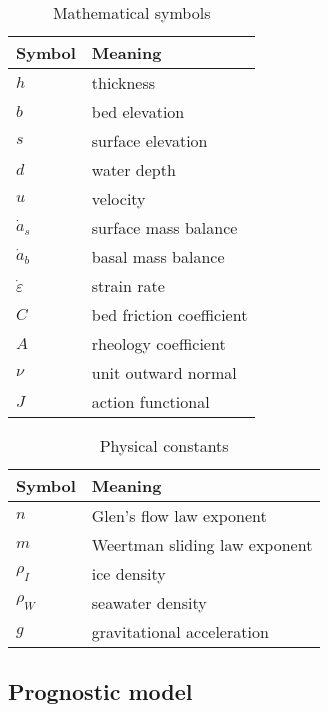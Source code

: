 \documentclass{article}
\theoremstyle{definition}
\theoremstyle{plain}
\begin{document}
\begin{table}[h]
    \begin{tabular}{l|l}
        Symbol & Meaning \\
        \hline
        $h$ & thickness \\
        $b$ & bed elevation  \\
        $s$ & surface elevation  \\
        $d$ & water depth \\
        $u$ & velocity \\
        $\dot a_s$ & surface mass balance \\
        $\dot a_b$ & basal mass balance \\
        $\dot\varepsilon$ & strain rate \\
        $C$ & bed friction coefficient \\
        $A$ & rheology coefficient \\
        $\nu$ & unit outward normal \\
        $J$ & action functional
    \end{tabular}
    \caption{Mathematical symbols}
\end{table}

\begin{table}[h]
    \begin{tabular}{l|l}
        Symbol & Meaning \\
        \hline
        $n$ & Glen's flow law exponent \\
        $m$ & Weertman sliding law exponent \\
        $\rho_I$ & ice density \\
        $\rho_W$ & seawater density \\
        $g$ & gravitational acceleration
    \end{tabular}
    \caption{Physical constants}
\end{table}


\subsection{Prognostic model}
\end{document}
